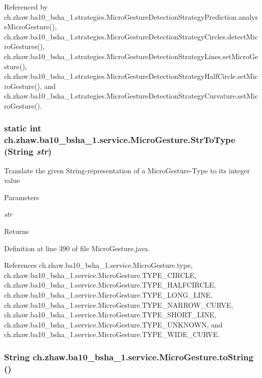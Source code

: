 Referenced by ch.zhaw.ba10\_\-bsha\_\-1.strategies.MicroGestureDetectionStrategyPrediction.analyseMicroGesture(), ch.zhaw.ba10\_\-bsha\_\-1.strategies.MicroGestureDetectionStrategyCircles.detectMicroGestures(), ch.zhaw.ba10\_\-bsha\_\-1.strategies.MicroGestureDetectionStrategyLines.setMicroGesture(), ch.zhaw.ba10\_\-bsha\_\-1.strategies.MicroGestureDetectionStrategyHalfCircle.setMicroGesture(), and ch.zhaw.ba10\_\-bsha\_\-1.strategies.MicroGestureDetectionStrategyCurvature.setMicroGesture().\hypertarget{classch_1_1zhaw_1_1ba10__bsha__1_1_1service_1_1MicroGesture_ad0059e70f1b2eb1ec1876ece697bc871}{
\subsubsection[{StrToType}]{\setlength{\rightskip}{0pt plus 5cm}static int ch.zhaw.ba10\_\-bsha\_\-1.service.MicroGesture.StrToType (String {\em str})}}
\label{classch_1_1zhaw_1_1ba10__bsha__1_1_1service_1_1MicroGesture_ad0059e70f1b2eb1ec1876ece697bc871}
Translate the given String-\/representation of a MicroGesture-\/Type to its integer value


\begin{DoxyParams}{Parameters}
\item[{\em str}]\end{DoxyParams}
\begin{DoxyReturn}{Returns}

\end{DoxyReturn}


Definition at line 390 of file MicroGesture.java.

References ch.zhaw.ba10\_\-bsha\_\-1.service.MicroGesture.type, ch.zhaw.ba10\_\-bsha\_\-1.service.MicroGesture.TYPE\_\-CIRCLE, ch.zhaw.ba10\_\-bsha\_\-1.service.MicroGesture.TYPE\_\-HALFCIRCLE, ch.zhaw.ba10\_\-bsha\_\-1.service.MicroGesture.TYPE\_\-LONG\_\-LINE, ch.zhaw.ba10\_\-bsha\_\-1.service.MicroGesture.TYPE\_\-NARROW\_\-CURVE, ch.zhaw.ba10\_\-bsha\_\-1.service.MicroGesture.TYPE\_\-SHORT\_\-LINE, ch.zhaw.ba10\_\-bsha\_\-1.service.MicroGesture.TYPE\_\-UNKNOWN, and ch.zhaw.ba10\_\-bsha\_\-1.service.MicroGesture.TYPE\_\-WIDE\_\-CURVE.\hypertarget{classch_1_1zhaw_1_1ba10__bsha__1_1_1service_1_1MicroGesture_adbf2189c0f8d6737493978f765e73fe0}{
\subsubsection[{toString}]{\setlength{\rightskip}{0pt plus 5cm}String ch.zhaw.ba10\_\-bsha\_\-1.service.MicroGesture.toString ()}}
\label{classch_1_1zhaw_1_1ba10__bsha__1_1_1service_1_1MicroGesture_adbf2189c0f8d6737493978f765e73fe0}



